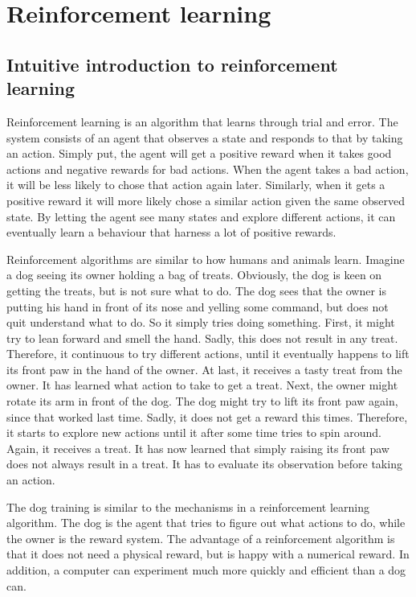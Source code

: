 \documentclass[class=book, crop=false]{standalone}
\begin{document}
\chapter{Reinforcement learning}
\section{Intuitive introduction to reinforcement learning}
Reinforcement learning is an algorithm that learns through trial and error. The system consists of an agent that observes a state and responds to that by taking an action. Simply put, the agent will get a positive reward when it takes good actions and negative rewards for bad actions. When the agent takes a bad action, it will be less likely to chose that action again later. Similarly, when it gets a positive reward it will more likely chose a similar action given the same observed state. By letting the agent see many states and explore different actions, it can eventually learn a behaviour that harness a lot of positive rewards. 

Reinforcement algorithms are similar to how humans and animals learn. Imagine a dog seeing its owner holding a bag of treats. Obviously, the dog is keen on getting the treats, but is not sure what to do. The dog sees that the owner is putting his hand in front of its nose and yelling some command, but does not quit understand what to do. So it simply tries doing something. First, it might try to lean forward and smell the hand. Sadly, this does not result in any treat. Therefore, it continuous to try different actions, until it eventually happens to lift its front paw in the hand of the owner. At last, it receives a tasty treat from the owner. It has learned what action to take to get a treat. Next, the owner might rotate its arm in front of the dog. The dog might try to lift its front paw again, since that worked last time. Sadly, it does not get a reward this times. Therefore, it starts to explore new actions until it after some time tries to spin around. Again, it receives a treat. It has now learned that simply raising its front paw does not always result in a treat. It has to evaluate its observation before taking an action. 

The dog training is similar to the mechanisms in a reinforcement learning algorithm. The dog is the agent that tries to figure out what actions to do, while the owner is the reward system. The advantage of a reinforcement algorithm is that it does not need a physical reward, but is happy with a numerical reward. In addition, a computer can experiment much more quickly and efficient than a dog can. 
\end{document}
